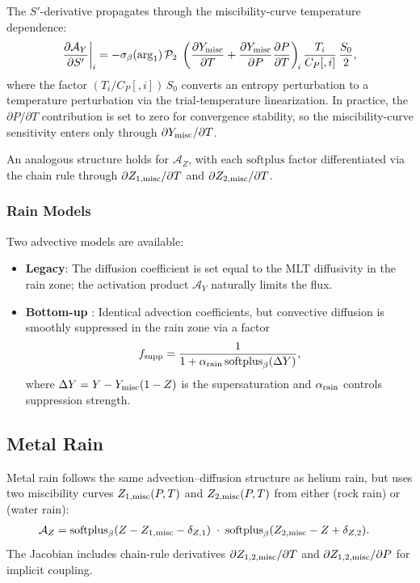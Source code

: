 \documentclass{aastex631}
\newcommand{\pp}{\partial}
\newcommand{\Cp}{C_P}
\newcommand{\Yeq}{Y_{\rm misc}}
\newcommand{\softplus}{\mathrm{softplus}}
\begin{document}
The $S'$-derivative propagates through the miscibility-curve temperature
dependence:
\begin{equation}\label{eq:dAY_dS}
  \frac{\pp\mathcal{A}_Y}{\pp S'}\bigg|_i
  = -\sigma_\beta(\mathrm{arg}_1)\,\mathcal{P}_2
    \;\left(\frac{\pp\Yeq}{\pp T}
    + \frac{\pp\Yeq}{\pp P}\frac{\pp P}{\pp T}\right)_{\!i}
    \frac{T_i}{\Cp[,i]}\,\frac{S_0}{2},
\end{equation}
where the factor $(T_i/\Cp[,i])\,S_0$ converts an entropy perturbation
to a temperature perturbation via the trial-temperature linearization.
In practice, the $\pp P/\pp T$ contribution is set to zero for
convergence stability, so the miscibility-curve sensitivity enters
only through $\pp\Yeq/\pp T$.

An analogous structure holds for $\mathcal{A}_Z$, with each
$\softplus$ factor differentiated via the chain rule through
$\pp Z_{1,{\rm misc}}/\pp T$ and $\pp Z_{2,{\rm misc}}/\pp T$.

\subsubsection{Rain Models}

Two advective models are available:

\begin{itemize}
  \item \textbf{Legacy}: The diffusion coefficient is set equal to
    the MLT diffusivity in the rain zone; the activation product
    $\mathcal{A}_Y$ naturally limits the flux.
  \item \textbf{Bottom-up} \citep{Helled2025}: Identical advection
    coefficients, but convective diffusion is smoothly suppressed in
    the rain zone via a factor
    \begin{equation}
      f_{\rm supp}
      = \frac{1}{1 + \alpha_{\rm rain}\,\softplus_\beta(\Delta Y)},
    \end{equation}
    where $\Delta Y = Y - \Yeq(1-Z)$ is the supersaturation and
    $\alpha_{\rm rain}$ controls suppression strength.
\end{itemize}

\subsection{Metal Rain}\label{sec:metal_rain}

Metal rain follows the same advection--diffusion structure as helium rain,
but uses two miscibility curves $Z_{1,{\rm misc}}(P,T)$ and
$Z_{2,{\rm misc}}(P,T)$ from either \citet{Rogers2025} (rock rain) or
\citet{Gupta2024} (water rain):
\begin{align}
  \mathcal{A}_Z
  &= \softplus_\beta(Z - Z_{1,{\rm misc}} - \delta_{Z,1})
  \;\cdot\;
  \softplus_\beta(Z_{2,{\rm misc}} - Z + \delta_{Z,2}).
\end{align}
The Jacobian includes chain-rule derivatives
$\pp Z_{1,2,\rm misc}/\pp T$ and $\pp Z_{1,2,\rm misc}/\pp P$ for
implicit coupling.
\end{document}
